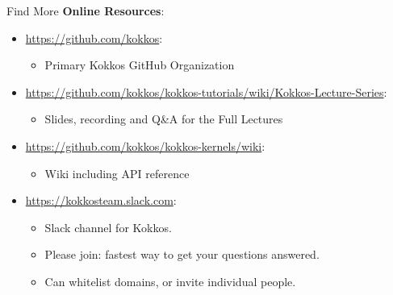 \begin{frame}{Find More}
\textbf{Online Resources}:
\begin{itemize}
        \item \url{https://github.com/kokkos}:
                \begin{itemize}
                        \item Primary Kokkos GitHub Organization
                \end{itemize}
        \item \url{https://github.com/kokkos/kokkos-tutorials/wiki/Kokkos-Lecture-Series}:
                \begin{itemize}
			\item{Slides, recording and Q\&A for the Full Lectures}
                \end{itemize}
        \item \url{https://github.com/kokkos/kokkos-kernels/wiki}:
                \begin{itemize}
                        \item Wiki including API reference
                \end{itemize}
        \item \url{https://kokkosteam.slack.com}:
                \begin{itemize}
                        \item Slack channel for Kokkos.
                        \item Please join: fastest way to get your questions answered.
                        \item Can whitelist domains, or invite individual people.
                \end{itemize}
\end{itemize}
\end{frame}



